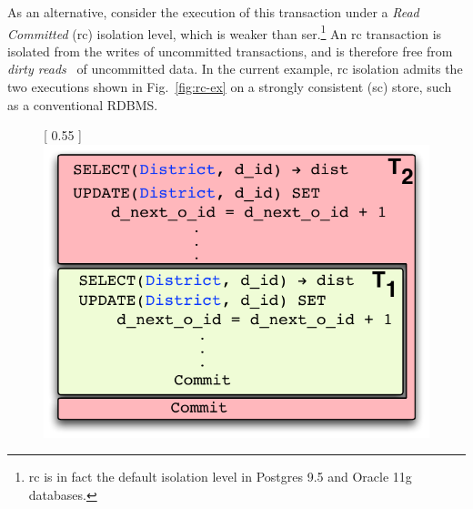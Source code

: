 As an alternative, consider the execution of this transaction under a
\emph{Read Committed} ({\sc rc}) isolation level, which is weaker than
{\sc ser}.\footnote{{\sc rc} is in fact the default isolation level in
Postgres 9.5 and Oracle 11g databases.} An {\sc rc} transaction is
isolated from the writes of uncommitted transactions, and is therefore
free from \emph{dirty reads}~\cite{berenson} of uncommitted data. In
the current example, {\sc rc} isolation admits the two executions
shown in Fig.~\ref{fig:rc-ex} on a strongly consistent ({\sc sc})
store, such as a conventional RDBMS.

\begin{figure}[!h]
\centering
{} [
  0.55\columnwidth
] {
  \includegraphics[scale=0.6]{Figures/motiv-eg-1-a}
}
\end{figure}
